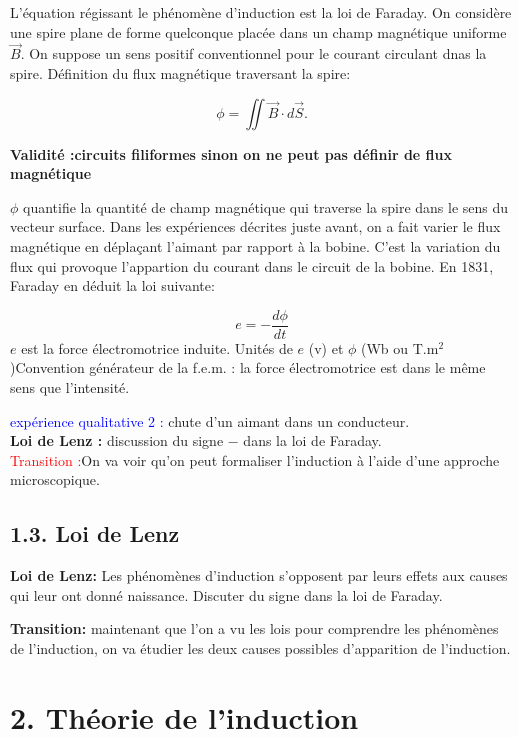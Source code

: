 \documentclass[french, a4paper, 10pt, twocolumn, landscape]{article}
\begin{document}
L'équation régissant le phénomène d'induction est la loi de Faraday. On considère une spire plane de forme quelconque placée dans un champ magnétique uniforme $\vec{B}$. On suppose un sens positif conventionnel pour le courant circulant dnas la spire. Définition du flux magnétique traversant la spire: 

\begin{equation}
    \phi =\iint \vec{B}\cdot d\vec{S}.
\end{equation}

\textbf{Validité :circuits filiformes sinon on ne peut pas définir de flux magnétique}

$\phi$ quantifie la quantité de champ magnétique qui traverse la spire dans le sens du vecteur surface. 
Dans les expériences décrites juste avant, on a fait varier le flux magnétique en déplaçant l'aimant par rapport à la bobine. C'est la variation du flux qui provoque l'appartion du courant dans le circuit de la bobine. En 1831, Faraday en déduit la loi suivante:

\begin{equation}
    e = - \dfrac{d\phi}{dt}
\end{equation}
$e$ est la force électromotrice induite. Unités de $e$ (v) et $\phi$ (Wb ou T.m$^2$)Convention générateur de la f.e.m. : la force électromotrice est dans le même sens que l'intensité.\medskip

\textcolor{blue}{expérience qualitative 2 :} chute d'un aimant dans un conducteur.\\
\textbf{Loi de Lenz :} discussion du signe $-$ dans la loi de Faraday.\\

\textcolor{red}{Transition :}On va voir qu'on peut formaliser l'induction à l'aide d'une approche microscopique. 

\subsection*{1.3. Loi de Lenz}

\textbf{Loi de Lenz:} Les phénomènes d'induction s'opposent par leurs effets aux causes qui leur ont donné naissance. Discuter du signe dans la loi de Faraday. \medskip

\textbf{Transition:} maintenant que l'on a vu les lois pour comprendre les phénomènes de l'induction, on va étudier  les deux causes possibles d'apparition de l'induction.

\section*{2. Théorie de l'induction}
\end{document}
